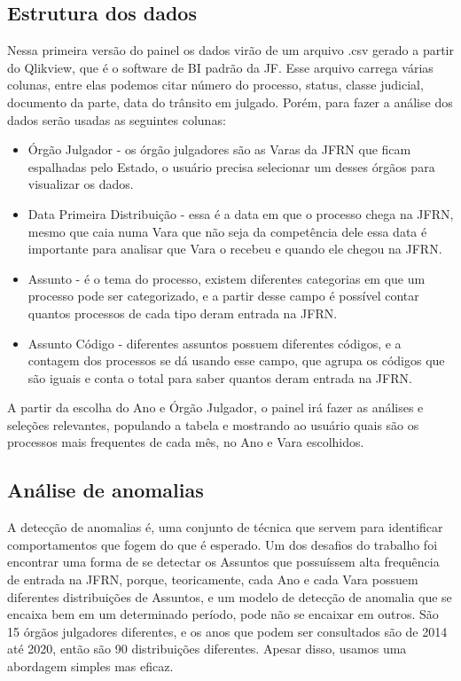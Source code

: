 \subsection{Estrutura dos dados}

Nessa primeira versão do painel os dados virão de um arquivo .csv gerado a partir do Qlikview, que é o software de BI padrão da JF. Esse arquivo carrega várias colunas, entre elas podemos citar número do processo, status, classe judicial, documento da parte, data do trânsito em julgado. Porém, para fazer a análise dos dados serão usadas as seguintes colunas:

\begin{itemize}
	\item Órgão Julgador - os órgão julgadores são as Varas da JFRN que ficam espalhadas pelo Estado, o usuário precisa selecionar um desses órgãos para visualizar os dados.
	
	\item Data Primeira Distribuição - essa é a data em que o processo chega na JFRN, mesmo que caia numa Vara que não seja da competência dele essa data é importante para analisar que Vara o recebeu e quando ele chegou na JFRN.
	
	\item Assunto - é o tema do processo, existem diferentes categorias em que um processo pode ser categorizado, e a partir desse campo é possível contar quantos processos de cada tipo deram entrada na JFRN.
	
	\item Assunto Código - diferentes assuntos possuem diferentes códigos, e a contagem dos processos se dá usando esse campo, que agrupa os códigos que são iguais e conta o total para saber quantos deram entrada na JFRN.
\end{itemize} 

A partir da escolha do Ano e Órgão Julgador, o painel irá fazer as análises e seleções relevantes, populando a tabela e mostrando ao usuário quais são os processos mais frequentes de cada mês, no Ano e Vara escolhidos.

\subsection{Análise de anomalias}

A detecção de anomalias é, uma conjunto de técnica que servem para identificar comportamentos que fogem do que é esperado. Um dos desafios do trabalho foi encontrar uma forma de se detectar os Assuntos que possuíssem alta frequência de entrada na JFRN, porque, teoricamente, cada Ano e cada Vara possuem diferentes distribuições de Assuntos, e um modelo de detecção de anomalia que se encaixa bem em um determinado período, pode não se encaixar em outros. São 15 órgãos julgadores diferentes, e os anos que podem ser consultados são de 2014 até 2020, então são 90 distribuições diferentes. Apesar disso, usamos uma abordagem simples mas eficaz.


